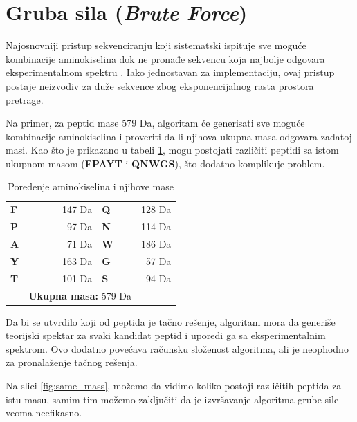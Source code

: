 \documentclass[12pt,oneside]{memoir}
\begin{document}
\section{Gruba sila (\emph{Brute Force})}
Najosnovniji pristup sekvenciranju koji sistematski ispituje sve moguće kombinacije aminokiselina dok ne pronađe sekvencu koja najbolje odgovara eksperimentalnom spektru \cite{online_lecture, online_book}. Iako jednostavan za implementaciju, ovaj pristup postaje neizvodiv za duže sekvence zbog eksponencijalnog rasta prostora pretrage.

Na primer, za peptid mase 579 Da, algoritam će generisati sve moguće kombinacije aminokiselina i proveriti da li njihova ukupna masa odgovara zadatoj masi. Kao što je prikazano u tabeli \ref{tab:primer1}, mogu postojati različiti peptidi sa istom ukupnom masom (\textbf{FPAYT} i \textbf{QNWGS}), što dodatno komplikuje problem.

\begin{table}[h]
\centering
\begin{tabular}{>{\centering\arraybackslash}m{1cm} r @{\hskip 1cm} >{\centering\arraybackslash}m{1cm} r}
\toprule
\textbf{F} & 147 Da & \textbf{Q} & 128 Da \\
\textbf{P} & 97 Da  & \textbf{N} & 114 Da \\
\textbf{A} & 71 Da  & \textbf{W} & 186 Da \\
\textbf{Y} & 163 Da & \textbf{G} & 57 Da  \\
\textbf{T} & 101 Da & \textbf{S} & 94 Da  \\
\midrule
\multicolumn{2}{r}{\textbf{Ukupna masa:} 579 Da} &
\multicolumn{2}{r}{\textbf{Ukupna masa:} 579 Da} \\
\bottomrule
\end{tabular}
\caption{Poređenje aminokiselina i njihove mase}
\label{tab:primer1}
\end{table}

Da bi se utvrdilo koji od peptida je tačno rešenje, algoritam mora da generiše teorijski spektar za svaki kandidat peptid i uporedi ga sa eksperimentalnim spektrom. Ovo dodatno povećava računsku složenost algoritma, ali je neophodno za pronalaženje tačnog rešenja.

Na slici \ref{fig:same_mass}, možemo da vidimo koliko postoji različitih peptida za istu masu, samim tim možemo zaključiti da je izvršavanje algoritma grube sile veoma neefikasno.
\end{document}
